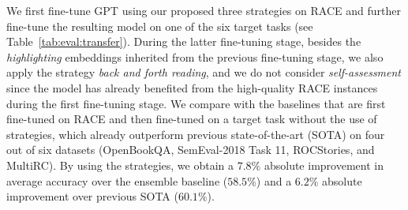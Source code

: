 \documentclass[11pt,a4paper]{article}
\begin{document}
We first fine-tune GPT using our proposed three strategies on RACE and further fine-tune the resulting model on one of the six target tasks (see Table~\ref{tab:eval:transfer}). During the latter fine-tuning stage, besides the \emph{highlighting} embeddings inherited from the previous fine-tuning stage, we also apply the strategy \emph{back and forth reading}, and we do not consider \emph{self-assessment} since the model has already benefited from the high-quality RACE instances during the first fine-tuning stage. We compare with the baselines that are first fine-tuned on RACE and then fine-tuned on a target task without the use of strategies, which already outperform previous state-of-the-art (SOTA) on four out of six datasets (OpenBookQA, SemEval-2018 Task 11, ROCStories, and MultiRC). By using the strategies, we obtain a $7.8\%$ absolute improvement in average accuracy over the ensemble baseline ($58.5\%$) and a $6.2\%$ absolute improvement over previous SOTA ($60.1\%$). 
\end{document}
